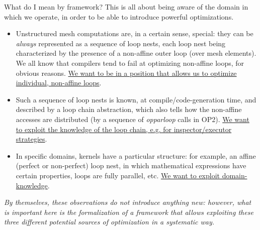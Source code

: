 \documentclass[a4paper]{article}
\begin{document}
What do I mean by framework? This is all about being aware of the domain in which we operate, in order to be able to introduce powerful optimizations. 
\begin{itemize}
\item Unstructured mesh computations are, in a certain sense, special: they can be \textit{always} represented as a sequence of loop nests, each loop nest being characterized by the presence of a non-affine outer loop (over mesh elements). We all know that compilers tend to fail at optimizing non-affine loops, for obvious reasons. \ul{We want to be in a position that allows us to optimize individual, non-affine loops}. 
\item Such a sequence of loop nests is known, at compile/code-generation time, and described by a loop chain abstraction, which also tells how the non-affine accesses are distributed (by a sequence of \textit{opparloop} calls in OP2). \ul{We want to exploit the knowledge of the loop chain, e.g. for inspector/executor strategies}.
\item In specific domains, kernels have a particular structure: for example, an affine (perfect or non-perfect) loop nest, in which mathematical expressions have certain properties, loops are fully parallel, etc. \ul{We want to exploit domain-knowledge}.
\end{itemize}
\textit{By themselves, these observations do not introduce anything new: however, what is important here is the formalization of a framework that allows exploiting these three different potential sources of optimization in a systematic way.}
\end{document}
